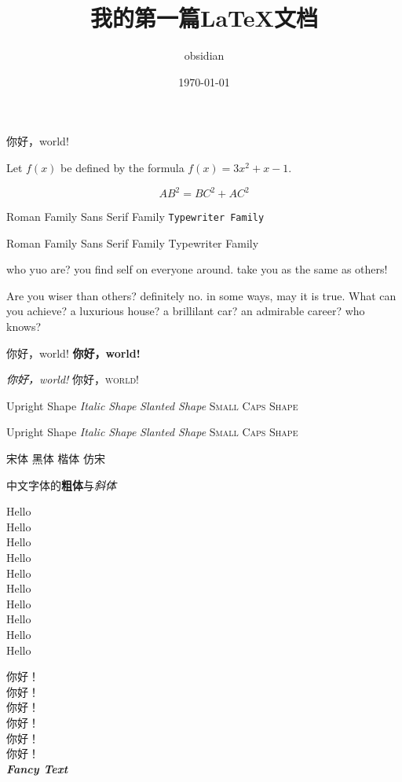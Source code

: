 \documentclass[UTF8]{ctexart}
\title{\heiti 我的第一篇\LaTeX{}文档}
\author{obsidian}
\date{\today}
\newcommand{\myfont}{\textit{\textbf{\textsf{Fancy Text}}}}
\begin{document}
\maketitle
你好，world!

Let $f(x)$ be defined by the formula $f(x)=3x^2+x-1$.

\begin{equation}
    AB^2=BC^2+AC^2 
\end{equation}

\textrm{Roman Family} \textsf{Sans Serif Family}
\texttt{Typewriter Family}

{\rmfamily Roman Family} {\sffamily Sans Serif Family}
{\ttfamily Typewriter Family}

{\sffamily who yuo are? you find self on everyone around. take you as the same as others!} 

{\ttfamily Are you wiser than others? definitely no. in some ways, may it is true. What can you achieve? a luxurious house? a brillilant car? an admirable career? who knows?}

\textmd{你好，world!} \textbf{你好，world!}

\textsl{你好，world!} \textsc{你好，world!}

\textup{Upright Shape} \textit{Italic Shape}
\textsl{Slanted Shape} \textsc{Small Caps Shape}

{\upshape Upright Shape} {\itshape Italic Shape} {\slshape Slanted Shape} {\scshape Small Caps Shape}

{\songti 宋体} {\heiti 黑体} {\kaishu 楷体} {\fangsong 仿宋}

中文字体的\textbf{粗体}与\textit{斜体}

{\tiny          Hello}\\
{\scriptsize    Hello}\\
{\footnotesize  Hello}\\
{\small         Hello}\\
{\normalsize    Hello}\\
{\large         Hello}\\
{\Large         Hello}\\
{\LARGE         Hello}\\
{\huge          Hello}\\
{\Huge          Hello}

 你好！\\
 你好！\\
 你好！\\
 你好！\\
 你好！\\
 你好！\\

\myfont
\end{document}
